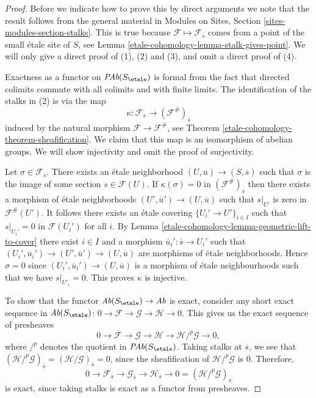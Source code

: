 \begin{proof}
Before we indicate how to prove this by direct arguments
we note that the result follows from the general material in
Modules on Sites, Section \ref{sites-modules-section-stalks}.
This is true because $\mathcal{F} \mapsto \mathcal{F}_{\overline{s}}$
comes from a point of the small \'etale site of $S$, see
Lemma \ref{etale-cohomology-lemma-stalk-gives-point}.
We will only give a direct proof of (1), (2) and (3), and omit
a direct proof of (4).

\medskip\noindent
Exactness as a functor on $\textit{PAb}(S_\etale)$ is formal from the
fact that directed colimits commute with all colimits and with finite
limits. The identification of the stalks in (2) is via the map
$$
\kappa :
\mathcal{F}_{\overline{s}}
\longrightarrow
(\mathcal{F}^\#)_{\overline{s}}
$$
induced by the natural morphism $\mathcal{F}\to \mathcal{F}^\#$, see
Theorem \ref{etale-cohomology-theorem-sheafification}.
We claim that this map is an isomorphism of abelian groups. We will show
injectivity and omit the proof of surjectivity.

\medskip\noindent
Let $\sigma\in \mathcal{F}_{\overline{s}}$.
There exists an \'etale neighborhood
$(U, \overline{u})\to (S, \overline{s})$ such that $\sigma$ is the image of some
section $s \in \mathcal{F}(U)$. If $\kappa(\sigma) = 0$ in
$(\mathcal{F}^\#)_{\overline{s}}$ then there exists a morphism of \'etale
neighborhoods $(U', \overline{u}')\to (U, \overline{u})$ such that
$s|_{U'}$ is zero in $\mathcal{F}^\#(U')$. It follows there
exists an \'etale covering
$\{U_i'\to U'\}_{i\in I}$ such that $s|_{U_i'}=0$ in
$\mathcal{F}(U_i')$ for all $i$. By Lemma \ref{etale-cohomology-lemma-geometric-lift-to-cover}
there exist $i \in I$ and a morphism
$\overline{u}_i': \overline{s} \to U_i'$ such that
$(U_i', \overline{u}_i') \to (U', \overline{u}')\to (U, \overline{u})$
are morphisms of \'etale neighborhoods. Hence $\sigma = 0$
since $(U_i', \overline{u}_i') \to (U, \overline{u})$
is a morphism of \'etale neighbourhoods such that
we have $s|_{U'_i}=0$. This proves $\kappa$ is injective.

\medskip\noindent
To show that the functor $\textit{Ab}(S_\etale) \to \textit{Ab}$ is
exact, consider any short exact sequence in $\textit{Ab}(S_\etale)$:
$
0\to \mathcal{F}\to \mathcal{G}\to \mathcal H \to 0.
$
This gives us the exact sequence of presheaves
$$
0 \to \mathcal{F} \to \mathcal{G} \to \mathcal H \to
\mathcal H/^p\mathcal{G} \to 0,
$$
where $/^p$ denotes the quotient in $\textit{PAb}(S_\etale)$.
Taking stalks at
$\overline{s}$, we see that $(\mathcal H /^p\mathcal{G})_{\bar{s}} =
(\mathcal H /\mathcal{G})_{\bar{s}} = 0$, since the sheafification of
$\mathcal H/^p\mathcal{G}$ is $0$.
Therefore,
$$
0\to \mathcal{F}_{\overline{s}} \to \mathcal{G}_{\overline{s}} \to
\mathcal{H}_{\overline{s}} \to 0 = (\mathcal H/^p\mathcal{G})_{\overline{s}}
$$
is exact, since taking stalks is exact as a functor from presheaves.
\end{proof}

